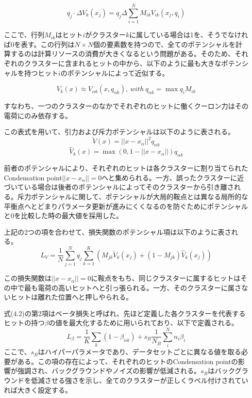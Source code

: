 \begin{equation}
q_j \cdot \Delta V_k(x_j) = q_j \Delta \sum_{i=1}^{N} M_{ik} V_{ik} (x_j ,q_i)
\end{equation}

ここで、行列$M_{ik}$はヒット$i$がクラスター$k$に属している場合は1を、そうでなければ0を表す。この行列は$N\times N$個の要素数を持つので、全てのポテンシャルを計算するのは計算リソースの消費が大きくなるという問題がある。そのため、それぞれのクラスターに含まれるヒットの中から、以下のように最も大きなポテンシャルを持つヒット$i$のポテンシャルによって近似する。

\begin{equation}
V_k(x) \approx V_{\alpha k}(x, q_{\alpha k}),\  with\ q_{\alpha k} = \max q_i M_{ik}  
\end{equation}

すなわち、一つのクラスターのなかでそれぞれのヒットに働くクーロン力はその電荷にのみ依存する。

この表式を用いて、引力および斥力ポテンシャルは以下のように表される。
\begin{equation}
\check{V}(x) = ||x-x_{\alpha} ||^2 q_{\alpha k}
\end{equation}
\begin{equation}
\hat{V}_{k}(x) = \max(0,1-||x-x_\alpha ||)q_{\alpha k}
\end{equation}

前者のポテンシャルにより、それぞれのヒットは各クラスターに割り当てられた Condensation point$||x-x_{\alpha}||=0$へと集められる。一方、誤ったクラスターに近づいている場合は後者のポテンシャルによってそのクラスターから引き離される。斥力ポテンシャルに関して、ポテンシャルが大局的鞍点とは異なる局所的な平衡点へとどまりパラメータ更新が進みにくくなるのを防ぐためにポテンシャルと0を比較した時の最大値を採用した。

上記の2つの項を合わせて、損失関数のポテンシャル項は以下のように表される。
\begin{equation}
L_V = \frac{1}{N}\sum_{j=1}^{N} q_j \sum_{k=1}^K \left(M_{jk} \check{V}_k(x_j) + (1 - M_{jk})\hat{V}_k(x_j)\right)
\end{equation}

この損失関数は$||x-x_{\alpha}|| = 0$に鞍点をもち、同じクラスターに属するヒットはその中で最も電荷の高いヒットへと引っ張られる。一方、そのクラスターに属さないヒットは離れた位置へと押しやられる。

式(4.2)の第2項はベータ損失と呼ばれ、先ほど定義した各クラスターを代表するヒットの持つ$\beta$の値を最大化するために用いられており、以下で定義される。
\begin{equation}
L_\beta = \frac{1}{K}\sum_k (1-\beta_{\alpha k}) +s_B \frac{1}{N_B}\sum_i^N n_i \beta_i
\end{equation}
ここで、$s_B$はハイパーパラメータであり、データセットごとに異なる値を取る必要がある。この項の存在によって、それぞれのヒットのCondensation pointの影響が強調され、バックグラウンドやノイズの影響が低減される。$s_B$はバックグラウンドを低減させる強さを示し、全てのクラスターが正しくラベル付けされていれば大きく設定する。


